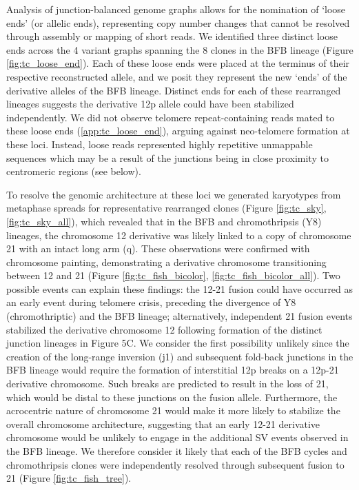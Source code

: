 \documentclass[phd,tocprelim]{cornell}
\begin{document}
Analysis of junction-balanced genome graphs allows for the nomination of ‘loose ends’ (or allelic ends), representing copy number changes that cannot be resolved through assembly or mapping of short reads. We identified three distinct loose ends across the 4 variant graphs spanning the 8 clones in the BFB lineage (Figure \ref{fig:tc_loose_end}). Each of these loose ends were placed at the terminus of their respective reconstructed allele, and we posit they represent the new ‘ends’ of the derivative alleles of the BFB lineage. Distinct ends for each of these rearranged lineages suggests the derivative 12p allele could have been stabilized independently. We did not observe telomere repeat-containing reads mated to these loose ends (\ref{app:tc_loose_end}), arguing against neo-telomere formation at these loci. Instead, loose reads represented highly repetitive unmappable sequences which may be a result of the junctions being in close proximity to centromeric regions (see below).

To resolve the genomic architecture at these loci we generated karyotypes from metaphase spreads for representative rearranged clones (Figure \ref{fig:tc_sky}, \ref{fig:tc_sky_all}), which revealed that in the BFB and chromothripsis (Y8) lineages, the chromosome 12 derivative was likely linked to a copy of chromosome 21 with an intact long arm (q). These observations were confirmed with chromosome painting, demonstrating a derivative chromosome transitioning between 12 and 21 (Figure \ref{fig:tc_fish_bicolor}, \ref{fig:tc_fish_bicolor_all}). Two possible events can explain these findings: the 12-21 fusion could have occurred as an early event during telomere crisis, preceding the divergence of Y8 (chromothriptic) and the BFB lineage; alternatively, independent 21 fusion events stabilized the derivative chromosome 12 following formation of the distinct junction lineages in Figure 5C. We consider the first possibility unlikely since the creation of the long-range inversion (j1) and subsequent fold-back junctions in the BFB lineage would require the formation of interstitial 12p breaks on a 12p-21 derivative chromosome. Such breaks are predicted to result in the loss of 21, which would be distal to these junctions on the fusion allele. Furthermore, the acrocentric nature of chromosome 21 would make it more likely to stabilize the overall chromosome architecture, suggesting that an early 12-21 derivative chromosome would be unlikely to engage in the additional SV events observed in the BFB lineage. We therefore consider it likely that each of the BFB cycles and chromothripsis clones were independently resolved through subsequent fusion to 21 (Figure \ref{fig:tc_fish_tree}).
\end{document}
